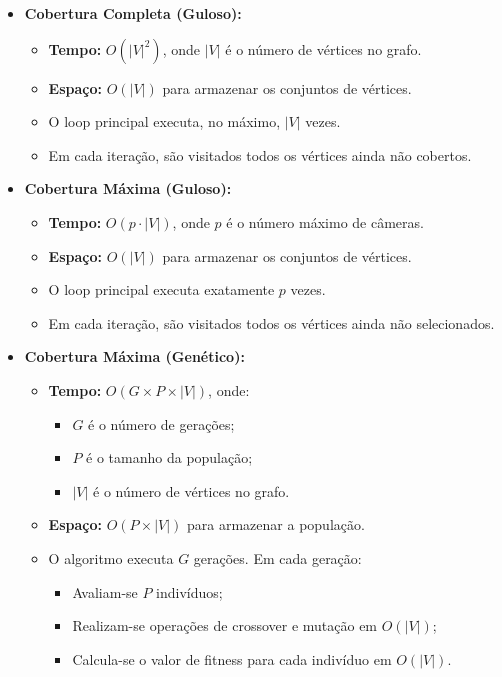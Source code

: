 \documentclass[12pt, a4paper]{report}
\begin{document}
\begin{itemize}
    \item \textbf{Cobertura Completa (Guloso):}
    \begin{itemize}
        \item \textbf{Tempo:} \(O(\lvert V \rvert^2)\), onde \(\lvert V \rvert\) é o número de vértices no grafo.
        \item \textbf{Espaço:} \(O(\lvert V \rvert)\) para armazenar os conjuntos de vértices.
        \item O loop principal executa, no máximo, \(\lvert V \rvert\) vezes.
        \item Em cada iteração, são visitados todos os vértices ainda não cobertos.
    \end{itemize}
    
    \item \textbf{Cobertura Máxima (Guloso):}
    \begin{itemize}
        \item \textbf{Tempo:} \(O(p \cdot \lvert V \rvert)\), onde \(p\) é o número máximo de câmeras.
        \item \textbf{Espaço:} \(O(\lvert V \rvert)\) para armazenar os conjuntos de vértices.
        \item O loop principal executa exatamente \(p\) vezes.
        \item Em cada iteração, são visitados todos os vértices ainda não selecionados.
    \end{itemize}

    \item \textbf{Cobertura Máxima (Genético):}
    \begin{itemize}
        \item \textbf{Tempo:} \(O(G \times P \times \lvert V \rvert)\), onde:
        \begin{itemize}
            \item \(G\) é o número de gerações;
            \item \(P\) é o tamanho da população;
            \item \(\lvert V \rvert\) é o número de vértices no grafo.
        \end{itemize}
        \item \textbf{Espaço:} \(O(P \times \lvert V \rvert)\) para armazenar a população.
        \item O algoritmo executa \(G\) gerações. Em cada geração:
        \begin{itemize}
            \item Avaliam-se \(P\) indivíduos;
            \item Realizam-se operações de crossover e mutação em \(O(\lvert V \rvert)\);
            \item Calcula-se o valor de fitness para cada indivíduo em \(O(\lvert V \rvert)\).
        \end{itemize}
    \end{itemize}
\end{itemize}
\end{document}
